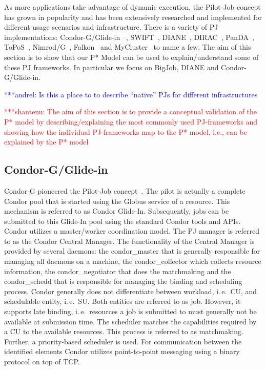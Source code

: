 \documentclass[conference,final]{IEEEtran}
\newcommand{\jhanote}[1]{ {\textcolor{red} { ***shantenu: #1 }}}
\newcommand{\alnote}[1]{ {\textcolor{blue} { ***andrel: #1 }}}
\newcommand{\alnote}[1]{}
\newcommand{\jhanote}[1]{}
\newcommand{\cu}{CU\xspace}
\newcommand{\upp}{\vspace*{-0.5em}}
\begin{document}
As more applications take advantage of dynamic execution, the
Pilot-Job concept has grown in popularity and has been extensively
researched and implemented for different usage scenarios and
infrastructure. There is a variety of PJ implementations:
Condor-G/Glide-in~\cite{condor-g}
, SWIFT~\cite{Wilde2011},
DIANE~\cite{Moscicki:908910}, DIRAC~\cite{1742-6596-219-6-062049},
PanDA~\cite{1742-6596-219-6-062041}, ToPoS~\cite{topos},
Nimrod/G~\cite{10.1109/HPC.2000.846563}, Falkon~\cite{1362680} and
MyCluster~\cite{1652061} to name a few. The aim of this section is to
show that our P* Model can be used to explain/understand some of these
PJ frameworks. In particular we focus on BigJob, DIANE and Condor-G/Glide-in.

\alnote{Is this a place to to describe ``native'' PJs for different 
infrastructures}

\jhanote{The aim of this section is to provide a conceptual validation
  of the P* model by describing/explaining the most commonly used
  PJ-frameworks and showing how the individual PJ-frameworks map to
  the P* model, i.e., can be explained by the P* model}


\upp
\subsection{Condor-G/Glide-in\upp\upp}

Condor-G pioneered the Pilot-Job concept~\cite{condor-g}. The pilot is
actually a complete Condor pool that is started using the Globus
service of a resource. This mechanism is referred to as Condor
Glide-In. Subsequently, jobs can be submitted to this Glide-In pool
using the standard Condor tools and APIs. Condor utilizes a
master/worker coordination model. The PJ manager is referred to as the
Condor Central Manager. The functionality of the Central Manager is
provided by several daemons: the condor\_master that is generally
responsible for managing all daemons on a machine, the
condor\_collector which collects resource information, the
condor\_negotiator that does the matchmaking and the condor\_schedd
that is responsible for managing the binding and scheduling
process. Condor generally does not differentiate between workload,
i.\,e.\ \cu, and schedulable entity, i.\,e.\ SU. Both entities are
referred to as job. However, it supports late binding, i.\,e.\
resources a job is submitted to must generally not be available at
submission time. The scheduler matches the capabilities required by a
\cu to the available resources. This process is referred to as
matchmaking. Further, a priority-based scheduler is used. For
communication between the identified elements Condor utilizes
point-to-point messaging using a binary protocol on top of TCP.
\end{document}

